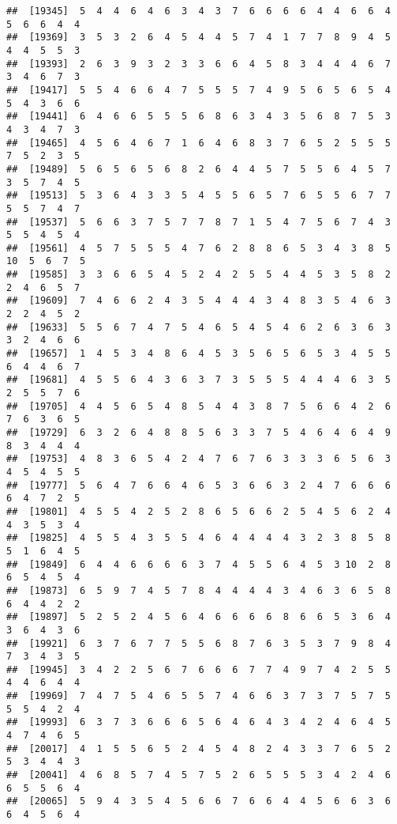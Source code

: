 \documentclass[
]{book}
\begin{document}
\begin{verbatim}
##  [19345]  5  4  4  6  4  6  3  4  3  7  6  6  6  6  4  4  6  6  4  5  6  6  4  4
##  [19369]  3  5  3  2  6  4  5  4  4  5  7  4  1  7  7  8  9  4  5  4  4  5  5  3
##  [19393]  2  6  3  9  3  2  3  3  6  6  4  5  8  3  4  4  4  6  7  3  4  6  7  3
##  [19417]  5  5  4  6  6  4  7  5  5  5  7  4  9  5  6  5  6  5  4  5  4  3  6  6
##  [19441]  6  4  6  6  5  5  5  6  8  6  3  4  3  5  6  8  7  5  3  4  3  4  7  3
##  [19465]  4  5  6  4  6  7  1  6  4  6  8  3  7  6  5  2  5  5  5  7  5  2  3  5
##  [19489]  5  6  5  6  5  6  8  2  6  4  4  5  7  5  5  6  4  5  7  3  5  7  4  5
##  [19513]  5  3  6  4  3  3  5  4  5  5  6  5  7  6  5  5  6  7  7  5  5  7  4  7
##  [19537]  5  6  6  3  7  5  7  7  8  7  1  5  4  7  5  6  7  4  3  5  5  4  5  4
##  [19561]  4  5  7  5  5  5  4  7  6  2  8  8  6  5  3  4  3  8  5 10  5  6  7  5
##  [19585]  3  3  6  6  5  4  5  2  4  2  5  5  4  4  5  3  5  8  2  2  4  6  5  7
##  [19609]  7  4  6  6  2  4  3  5  4  4  4  3  4  8  3  5  4  6  3  2  2  4  5  2
##  [19633]  5  5  6  7  4  7  5  4  6  5  4  5  4  6  2  6  3  6  3  3  2  4  6  6
##  [19657]  1  4  5  3  4  8  6  4  5  3  5  6  5  6  5  3  4  5  5  6  4  4  6  7
##  [19681]  4  5  5  6  4  3  6  3  7  3  5  5  5  4  4  4  6  3  5  2  5  5  7  6
##  [19705]  4  4  5  6  5  4  8  5  4  4  3  8  7  5  6  6  4  2  6  7  6  3  6  5
##  [19729]  6  3  2  6  4  8  8  5  6  3  3  7  5  4  6  4  6  4  9  8  3  4  4  4
##  [19753]  4  8  3  6  5  4  2  4  7  6  7  6  3  3  3  6  5  6  3  4  5  4  5  5
##  [19777]  5  6  4  7  6  6  4  6  5  3  6  6  3  2  4  7  6  6  6  6  4  7  2  5
##  [19801]  4  5  5  4  2  5  2  8  6  5  6  6  2  5  4  5  6  2  4  4  3  5  3  4
##  [19825]  4  5  5  4  3  5  5  4  6  4  4  4  4  3  2  3  8  5  8  5  1  6  4  5
##  [19849]  6  4  4  6  6  6  6  3  7  4  5  5  6  4  5  3 10  2  8  6  5  4  5  4
##  [19873]  6  5  9  7  4  5  7  8  4  4  4  4  3  4  6  3  6  5  8  6  4  4  2  2
##  [19897]  5  2  5  2  4  5  6  4  6  6  6  6  8  6  6  5  3  6  4  3  6  4  3  6
##  [19921]  6  3  7  6  7  7  5  5  6  8  7  6  3  5  3  7  9  8  4  7  3  4  3  5
##  [19945]  3  4  2  2  5  6  7  6  6  6  7  7  4  9  7  4  2  5  5  4  4  6  4  4
##  [19969]  7  4  7  5  4  6  5  5  7  4  6  6  3  7  3  7  5  7  5  5  5  4  2  4
##  [19993]  6  3  7  3  6  6  6  5  6  4  6  4  3  4  2  4  6  4  5  4  7  4  6  5
##  [20017]  4  1  5  5  6  5  2  4  5  4  8  2  4  3  3  7  6  5  2  5  3  4  4  3
##  [20041]  4  6  8  5  7  4  5  7  5  2  6  5  5  5  3  4  2  4  6  6  5  5  6  4
##  [20065]  5  9  4  3  5  4  5  6  6  7  6  6  4  4  5  6  6  3  6  6  4  5  6  4

\end{verbatim}
\end{document}
